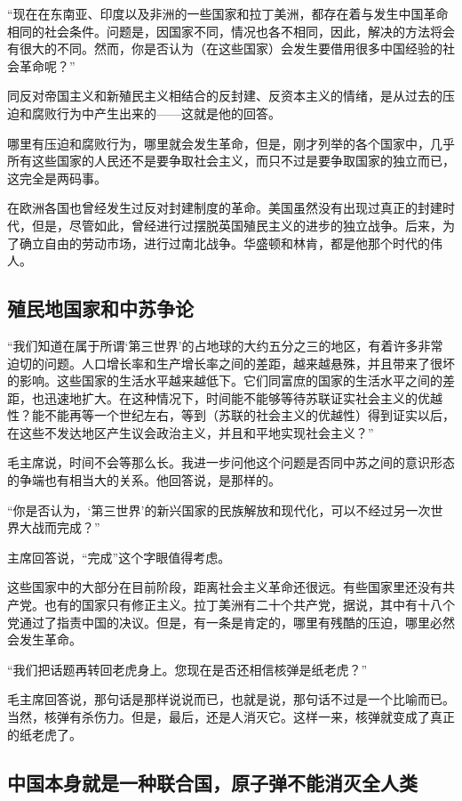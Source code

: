 “现在在东南亚、印度以及非洲的一些国家和拉丁美洲，都存在着与发生中国革命相同的社会条件。问题是，因国家不同，情况也各不相同，因此，解决的方法将会有很大的不同。然而，你是否认为（在这些国家）会发生要借用很多中国经验的社会革命呢？”

同反对帝国主义和新殖民主义相结合的反封建、反资本主义的情绪，是从过去的压迫和腐败行为中产生出来的——这就是他的回答。

哪里有压迫和腐败行为，哪里就会发生革命，但是，刚才列举的各个国家中，几乎所有这些国家的人民还不是要争取社会主义，而只不过是要争取国家的独立而已，这完全是两码事。

在欧洲各国也曾经发生过反对封建制度的革命。美国虽然没有出现过真正的封建时代，但是，尽管如此，曾经进行过摆脱英国殖民主义的进步的独立战争。后来，为了确立自由的劳动市场，进行过南北战争。华盛顿和林肯，都是他那个时代的伟人。

\subsection{殖民地国家和中苏争论}

“我们知道在属于所谓‘第三世界’的占地球的大约五分之三的地区，有着许多非常迫切的问题。人口增长率和生产增长率之间的差距，越来越悬殊，并且带来了很坏的影响。这些国家的生活水平越来越低下。它们同富庶的国家的生活水平之间的差距，也迅速地扩大。在这种情况下，时间能不能够等待苏联证实社会主义的优越性？能不能再等一个世纪左右，等到（苏联的社会主义的优越性）得到证实以后，在这些不发达地区产生议会政治主义，并且和平地实现社会主义？”

毛主席说，时间不会等那么长。我进一步问他这个问题是否同中苏之间的意识形态的争端也有相当大的关系。他回答说，是那样的。

“你是否认为，‘第三世界’的新兴国家的民族解放和现代化，可以不经过另一次世界大战而完成？”

主席回答说，“完成”这个字眼值得考虑。

这些国家中的大部分在目前阶段，距离社会主义革命还很远。有些国家里还没有共产党。也有的国家只有修正主义。拉丁美洲有二十个共产党，据说，其中有十八个党通过了指责中国的决议。但是，有一条是肯定的，哪里有残酷的压迫，哪里必然会发生革命。

“我们把话题再转回老虎身上。您现在是否还相信核弹是纸老虎？”

毛主席回答说，那句话是那样说说而已，也就是说，那句话不过是一个比喻而已。当然，核弹有杀伤力。但是，最后，还是人消灭它。这样一来，核弹就变成了真正的纸老虎了。

\subsection{中国本身就是一种联合国，原子弹不能消灭全人类}

